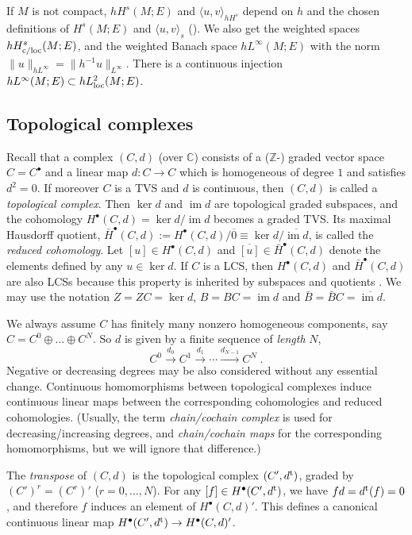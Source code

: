 \documentclass{memo-l}
\theoremstyle{plain}
\theoremstyle{definition}
\theoremstyle{remark}
\newcommand{\C}{\mathbb{C}}
\newcommand{\Z}{\mathbb{Z}}
\newcommand{\im}{\operatorname{im}}
\newcommand{\trans}{{\text{\rm t}}}
\numberwithin{section}{chapter}
\numberwithin{equation}{section}%
\begin{document}
If $M$ is not compact, $hH^s(M;E)$ and $\langle u,v\rangle_{hH^s}$ depend on $h$ and the chosen definitions of $H^s(M;E)$ and $\langle u,v\rangle_s$ (). We also get the weighted spaces $hH^s_{\text{\rm c/loc}}(M;E)$,  and the weighted Banach space $hL^\infty(M;E)$  with the norm $\|u\|_{hL^\infty}=\|h^{-1}u\|_{L^\infty}$. There is a continuous injection $hL^\infty(M;E)\subset hL^2_{\text{\rm loc}}(M;E)$.




\subsection{Topological complexes}\label{ss: top complexes}

Recall that a complex $(C,d)$ (over $\C$) consists of a ($\Z$-) graded vector space $C=C^\bullet$ and a linear map $d:C\to C$ which is homogeneous of degree $1$ and satisfies $d^2=0$. If moreover $C$ is a TVS and $d$ is continuous, then $(C,d)$ is called a \emph{topological complex}. Then $\ker d$ and $\im d$ are topological graded subspaces, and the cohomology $H^\bullet(C,d)=\ker d/\im d$ becomes a graded TVS. Its maximal Hausdorff quotient, $\bar H^\bullet(C,d):=H^\bullet(C,d)/\overline 0\equiv\ker d/\overline{\im d}$, is called the \emph{reduced cohomology}. Let $[u]\in H^\bullet(C,d)$ and $\overline{[u]}\in\bar H^\bullet(C,d)$ denote the elements defined by any $u\in\ker d$. If $C$ is a LCS, then $H^\bullet(C,d)$ and $\bar H^\bullet(C,d)$ are also LCSs because this property is inherited by subspaces and quotients \cite[Section~II.4]{Schaefer1971}. We may use the notation $Z=ZC=\ker d$, $B=BC=\im d$ and $\bar B=\bar BC=\overline{\im d}$. 

We always assume $C$ has finitely many nonzero homogeneous components, say $C=C^0\oplus\dots\oplus C^N$. So $d$ is given by a finite sequence of \emph{length} $N$,
\[
C^0 \xrightarrow{d_0} C^1 \xrightarrow{d_1} \cdots \xrightarrow{d_{N-1}} C^N\;.
\]
Negative or decreasing degrees may be also considered without any essential change. Continuous homomorphisms between topological complexes induce continuous linear maps between the corresponding cohomologies and reduced cohomologies. (Usually, the term \emph{chain/cochain complex} is used for decreasing/increasing degrees, and \emph{chain/cochain maps} for the corresponding homomorphisms, but we will ignore that difference.)

The \emph{transpose} of $(C,d)$ is the topological complex $(C',d^\trans)$, graded by $(C')^r=(C^r)'$ ($r=0,\dots,N$). 
For any $[f]\in H^\bullet(C',d^\trans)$, we have $fd=d^\trans(f)=0$, and therefore $f$ induces an element of $H^\bullet(C,d)'$. This defines a canonical continuous linear map $H^\bullet(C',d^\trans)\to H^\bullet(C,d)'$.
\end{document}
